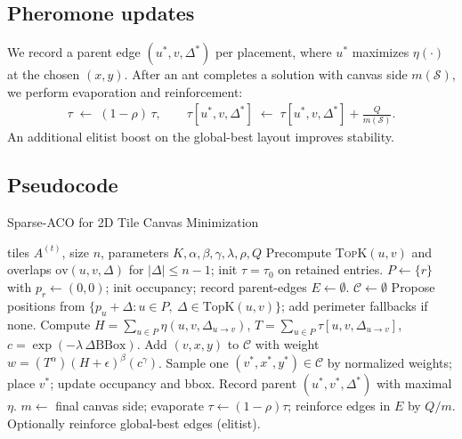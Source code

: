 \documentclass[11pt]{article}
\begin{document}
\subsection{Pheromone updates}
We record a parent edge $(u^*,v,\Delta^*)$ per placement, where $u^*$ maximizes $\eta(\cdot)$ at the chosen $(x,y)$. After an ant completes a solution with canvas side $m(\mathcal{S})$, we perform evaporation and reinforcement:
\begin{align}
 \tau \;\leftarrow\; (1-\rho)\,\tau,\qquad \tau[u^*,v,\Delta^*] \;\leftarrow\; \tau[u^*,v,\Delta^*] + \frac{Q}{m(\mathcal{S})}.
\end{align}
An additional elitist boost on the global-best layout improves stability.

\subsection{Pseudocode}
\begin{algorithm}[H]
\caption{Sparse-ACO for 2D Tile Canvas Minimization}
\begin{algorithmic}[1]
\Require tiles $A^{(t)}$, size $n$, parameters $K,\alpha,\beta,\gamma,\lambda,\rho,Q$
\State Precompute \textsc{TopK}$(u,v)$ and overlaps $\mathrm{ov}(u,v,\Delta)$ for $|\Delta|\le n-1$; init $\tau=\tau_0$ on retained entries.
    \State $P\gets\{r\}$ with $p_r\gets(0,0)$; init occupancy; record parent-edges $E\gets\emptyset$.
      \State $\mathcal{C}\gets\emptyset$ 
        \State Propose positions from $\{p_u+\Delta: u\in P,\ \Delta\in\mathrm{TopK}(u,v)\}$; add perimeter fallbacks if none.
          \State Compute $H=\sum_{u\in P}\eta(u,v,\Delta_{u\to v})$, $T=\sum_{u\in P}\tau[u,v,\Delta_{u\to v}]$, $c=\exp(-\lambda\,\Delta\mathrm{BBox})$.
          \State Add $(v,x,y)$ to $\mathcal{C}$ with weight $w=(T^{\alpha})(H+\epsilon)^{\beta}(c^{\gamma})$.
        \EndFor
      \EndFor
      \State Sample one $(v^*,x^*,y^*)\in\mathcal{C}$ by normalized weights; place $v^*$; update occupancy and bbox.
      \State Record parent $(u^*,v^*,\Delta^*)$ with maximal $\eta$.
    \EndWhile
    \State $m\gets$ final canvas side; evaporate $\tau\leftarrow(1-\rho)\tau$; reinforce edges in $E$ by $Q/m$.
  \EndFor
  \State Optionally reinforce global-best edges (elitist).
\EndFor
\end{algorithmic}
\end{algorithm}
\end{document}
